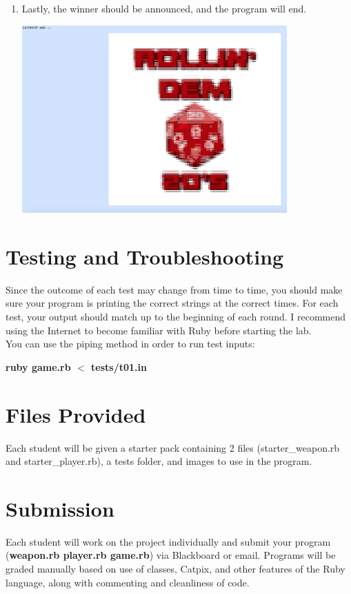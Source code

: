 \documentclass{article}
\begin{document}
\begin{enumerate}
\item Lastly, the winner should be announced, and the program will end.
\begin{center}
    \includegraphics[width=0.8\textwidth]{end}
\end{center}

\end{enumerate}

\section*{Testing and Troubleshooting}
Since the outcome of each test may change from time to time, you should make sure your program is printing the correct strings at the correct times. For each test, your output should match up to the beginning of each round. I recommend using the Internet to become familiar with Ruby before starting the lab. \\
You can use the piping method in order to run test inputs:
\begin{center}
\textbf{ruby game.rb $<$ tests/t01.in}
\end{center}

\section*{Files Provided}
Each student will be given a starter pack containing 2 files (starter\_weapon.rb and starter\_player.rb), a tests folder, and images to use in the program.

\section*{Submission}
Each student will work on the project individually and submit your program (\textbf{weapon.rb player.rb game.rb}) via Blackboard or email. Programs will be graded manually based on use of classes, Catpix, and other features of the  Ruby language, along with commenting and cleanliness of code.
\end{document}

